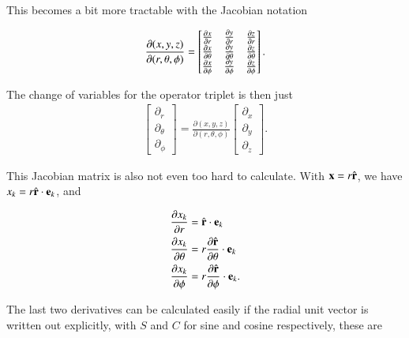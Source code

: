 This becomes a bit more tractable with the Jacobian notation

\begin{align}\label{eqn:jacobianSphericalPolar:3}
\frac{\partial (x,y,z)}{\partial (r,\theta,\phi)}
=
\begin{bmatrix}
\PD{r}{x} &\PD{r}{y} &\PD{r}{z}  \\
\PD{\theta}{x} &\PD{\theta}{y} &\PD{\theta}{z}  \\
\PD{\phi}{x} &\PD{\phi}{y} &\PD{\phi}{z}
\end{bmatrix}.
\end{align}

The change of variables for the operator triplet is then just
\begin{align}\label{eqn:jacobianSphericalPolar:4}
\begin{bmatrix}
\partial_r \\
\partial_\theta \\
\partial_\phi
\end{bmatrix}
= 
\frac{\partial (x,y,z)}{\partial (r,\theta,\phi)}
\begin{bmatrix}
\partial_x \\
\partial_y \\
\partial_z
\end{bmatrix}.
\end{align}

This Jacobian matrix is also not even too hard to calculate.  With $\Bx = r \rcap$, we have $x_k = r \rcap \cdot \Be_k$, and

\begin{subequations}
\begin{align}\label{eqn:jacobianSphericalPolar:5}
\PD{r}{x_k} &= \rcap \cdot \Be_k \\
\PD{\theta}{x_k} &= r \PD{\theta}{\rcap} \cdot \Be_k \\
\PD{\phi}{x_k} &= r \PD{\phi}{\rcap} \cdot \Be_k.
\end{align}
\end{subequations}

The last two derivatives can be calculated easily if the radial unit vector is written out explicitly, with $S$ and $C$ for sine and cosine respectively, these are

